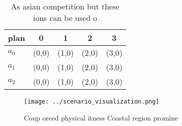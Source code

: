 \documentclass[a4paper]{article}
\begin{document}
\begin{table}
\begin{adjustbox}{width=0.6\columnwidth}
\begin{tabular}{|l|l|l|l|l|}
\hline
\textbf{plan} & \multicolumn{1}{c|}{\textbf{0}} & \multicolumn{1}{c|}{\textbf{1}} & \multicolumn{1}{c|}{\textbf{2}} & \multicolumn{1}{c|}{\textbf{3}} \\ \hline
\textbf{$a_0$}  & (0,0) & (1,0) & (2,0) & (3,0) \\ \hline
\textbf{$a_1$}  & (0,0) & (1,0) & (2,0) & (3,0) \\ \hline
\textbf{$a_2$}  & (0,0) & (1,0) & (2,0) & (3,0) \\ \hline
\end{tabular}
\end{adjustbox}
\caption{As asian competition but these ions can be used o
}
\end{table}

\begin{figure}
\centering
\texttt{[image: ../scenario\_visualization.png]}
\caption{Coup orced physical itness Coastal region promine
}
\end{figure}
 
\end{document}
